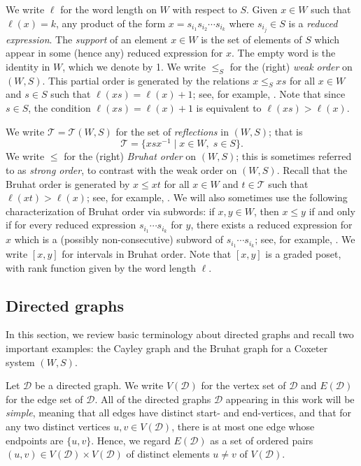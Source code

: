 \documentclass[11pt]{amsart}
\theoremstyle{plain}
\theoremstyle{definition}
\newcommand{\cD}{\mathcal{D}}
\newcommand{\cT}{\mathcal T}
\numberwithin{equation}{subsection}
\begin{document}
We write $\ell$ for the word length on $W$ with respect to $S$. Given $x \in W$ such that $\ell(x) = k$, any product of the form $x = s_{i_1}s_{i_2}\cdots s_{i_k}$ where $s_{i_j} \in S$ is a \emph{reduced expression}. The \emph{support} of an element $x \in W$ is the set of elements of $S$ which appear in some (hence any) reduced expression for $x$. 
The empty word is the identity in $W$, which we denote by 1. %
We write $\leq_S$ for the (right) \emph{weak order} on $(W,S)$. This partial order is generated by the relations $x \leq_S xs$ for all $x \in W$ and $s \in S$ such that $\ell(xs) = \ell(x) + 1$; see, for example, \cite[Def.~3.1.1]{BjoernerBrenti}. Note that since $s \in S$, the condition $\ell(xs) = \ell(x)+1$ is equivalent to $\ell(xs) > \ell(x)$.


We write $\cT = \cT(W,S)$ for the set of \emph{reflections} in $(W,S)$; that is 
\[\cT = \{ xsx^{-1} \mid x \in W,\; s \in S \}.\] 
We write $\leq$ for the (right) \emph{Bruhat order} on $(W,S)$; this is sometimes referred to as \emph{strong order}, to contrast with the weak order on $(W,S)$. Recall that the Bruhat order is generated by $x \leq xt$ for all $x \in W$ and $t \in \cT$ such that $\ell(xt) > \ell(x)$; see, for example, \cite[Def.~2.1.1]{BjoernerBrenti}. We will also sometimes use the following characterization of Bruhat order via subwords: if $x, y \in W$, then $x \leq y$ if and only if for every reduced expression $s_{i_1} \cdots s_{i_k}$ for $y$, there exists a reduced expression for $x$ which is a (possibly non-consecutive) subword of $s_{i_1} \cdots s_{i_k}$; see, for example, \cite[Theorem 2.2.2]{BjoernerBrenti}. We write $[x,y]$ for intervals in Bruhat order. Note that $[x,y]$ is a graded poset, with rank function given by the word length $\ell$. 


\subsection{Directed graphs}\label{sec:directed}

In this section, we review basic terminology about directed graphs and recall two important examples: the Cayley graph and the Bruhat graph for a Coxeter system $(W,S)$.

Let $\cD$ be a directed graph. We write $V(\cD)$ for the vertex set of $\cD$ and $E(\cD)$ for the edge set of $\cD$. All of the directed graphs $\cD$ appearing in this work will be \emph{simple}, meaning that all edges have distinct start- and end-vertices, and that for any two distinct vertices $u,v \in V(\cD)$, there is at most one edge whose endpoints are $\{u,v\}$. Hence, we regard $E(\cD)$ as a set of ordered pairs $(u,v) \in V(\cD) \times V(\cD)$ of distinct elements $u \neq v$ of $V(\cD)$.
\end{document}
